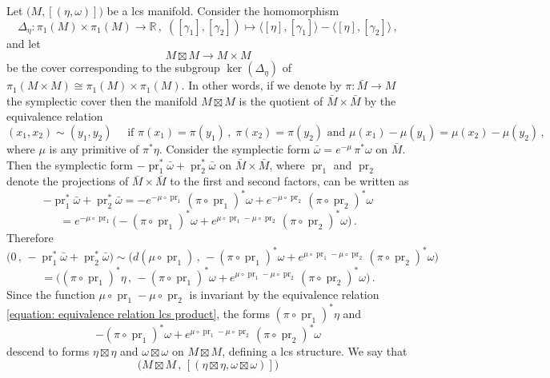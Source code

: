 \documentclass{amsart}
\DeclareMathOperator{\pr}{pr}
\theoremstyle{remark}
\begin{document}
Let $\big( M, [(\eta, \omega)] \big)$
be a lcs manifold.
Consider the homomorphism
\[
\Delta_{\eta}: \pi_1 (M) \times \pi_1 (M) \rightarrow \mathbb{R} \,,\;
( [\gamma_1], [\gamma_2] ) \mapsto
\langle [\eta], [\gamma_1] \rangle - \langle [\eta], [\gamma_2] \rangle \,,
\]
and let
\[
M \boxtimes M \rightarrow M \times M
\]
be the cover corresponding to the subgroup
$\ker (\Delta_{\eta})$
of $\pi_1 (M \times M) \cong \pi_1 (M) \times \pi_1 (M)$.
In other words,
if we denote by $\pi: \bar{M} \rightarrow M$ the symplectic cover
then the manifold $M \boxtimes M$ is the quotient of $\bar{M} \times \bar{M}$
by the equivalence relation
\begin{equation}\label{equation: equivalence relation lcs product}
(x_1, x_2) \sim (y_1, y_2) \quad \text{ if }
\pi (x_1) = \pi (y_1) \,,\; \pi (x_2) = \pi (y_2)
\text{ and } \mu (x_1) - \mu (y_1) = \mu (x_2) - \mu (y_2) \,,
\end{equation}
where $\mu$ is any primitive of $\pi^{\ast}\eta$.
Consider the symplectic form
$\bar{\omega} = e^{-\mu} \, \pi^{\ast} \omega$
on $\bar{M}$.
Then the symplectic form
$- \pr_1^{\ast} \bar{\omega} + \pr_2^{\ast} \bar{\omega}$
on $\bar{M} \times \bar{M}$,
where $\pr_1$ and $\pr_2$ denote the projections of $\bar{M} \times \bar{M}$
to the first and second factors,
can be written as
\[
- \pr_1^{\ast} \bar{\omega} + \pr_2^{\ast} \bar{\omega}
= - e^{-\mu \circ \pr_1} \, (\pi\circ \pr_1)^{\ast} \omega
+ e^{-\mu \circ \pr_2} \, (\pi \circ \pr_2)^{\ast} \omega
\]
\[
= e^{-\mu \circ \pr_1} \big( - (\pi \circ \pr_1)^{\ast} \omega
+ e^{\mu \circ \pr_1 - \mu \circ \pr_2} \, (\pi \circ \pr_2)^{\ast} \omega \big) \,.
\]
Therefore
\[
\big(0 \,,\, - \pr_1^{\ast} \bar{\omega} + \pr_2^{\ast} \bar{\omega} \big) \sim
\big( d(\mu \circ \pr_1) \,,\, - (\pi \circ \pr_1)^{\ast} \omega
+ e^{\mu \circ \pr_1 - \mu \circ \pr_2} \, (\pi \circ \pr_2)^{\ast} \omega \big)
\]
\[
= \big( (\pi \circ \pr_1)^{\ast} \eta \,,\,
- (\pi \circ \pr_1)^{\ast} \omega
+ e^{\mu \circ \pr_1 - \mu \circ \pr_2} \, (\pi \circ \pr_2)^{\ast} \omega \big) \,.
\]
Since the function $\mu \circ \pr_1 - \mu \circ \pr_2$
is invariant by the equivalence relation
\eqref{equation: equivalence relation lcs product}, the forms 
$(\pi \circ \pr_1)^{\ast} \eta$
and
$$
- (\pi \circ \pr_1)^{\ast} \omega
+ e^{\mu \circ \pr_1 - \mu \circ \pr_2} \, (\pi \circ \pr_2)^{\ast} \omega
$$
descend to forms $\eta \boxtimes \eta$
and $\omega \boxtimes \omega$ on $M \boxtimes M$,
defining a lcs structure.
We say that
$$
\big(M \boxtimes M \,,\,
[(\eta \boxtimes \eta, \omega \boxtimes \omega)] \big)
$$
\end{document}
